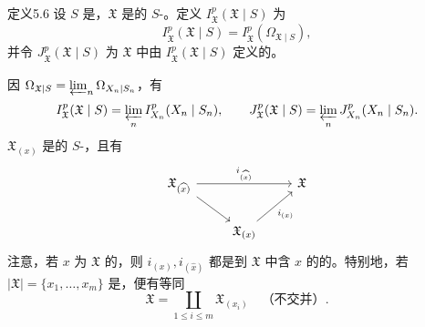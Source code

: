 \begin{SGAresult}{定义}{5.6}
设 $S$ 是，$\mathfrak X$ 是的 $S$-。定义 $I_{\mathfrak X}^p(\mathfrak X\mid S)$ 为
\[
I_{\mathfrak X}^p(\mathfrak X\mid S)=I_{\mathfrak X}^p(\Omega_{\mathfrak X\mid S}),
\]
并令 $J_{\mathfrak X}^p(\mathfrak X\mid S)$ 为 $\mathfrak X$ 中由 $I_{\mathfrak X}^p(\mathfrak X\mid S)$ 定义的。
\end{SGAresult}
因 $\Omega_{\mathfrak X\mid S}=\varprojlim_n\Omega_{X_n\mid S_n}$，有
\[
I_{\mathfrak X}^p(\mathfrak X\mid S)=\varprojlim_n I_{X_n}^p(X_n\mid S_n),
\qquad
J_{\mathfrak X}^p(\mathfrak X\mid S)=\varprojlim_n J_{X_n}^p(X_n\mid S_n).
\]
$\mathfrak X_{(x)}$ 是的 $S$-，且有
\[
\begin{tikzcd}
\mathfrak X_{(\widehat x)}\arrow[rr,"i_{(\widehat x)}"]\arrow[dr]&&\mathfrak X\\
&\mathfrak X_{(x)}\arrow[ur,"i_{(x)}"']&
\end{tikzcd}
\]
注意，若 $x$ 为 $\mathfrak X$ 的，则 $i_{(x)},i_{(\widehat x)}$ 都是到 $\mathfrak X$ 中含 $x$ 的的。特别地，若 $|\mathfrak X|=\{x_1,\ldots,x_m\}$ 是，便有等同
\[
\mathfrak X=\coprod_{1\leq i\leq m}\mathfrak X_{(x_i)}
\quad\text{（不交并）}.
\]

